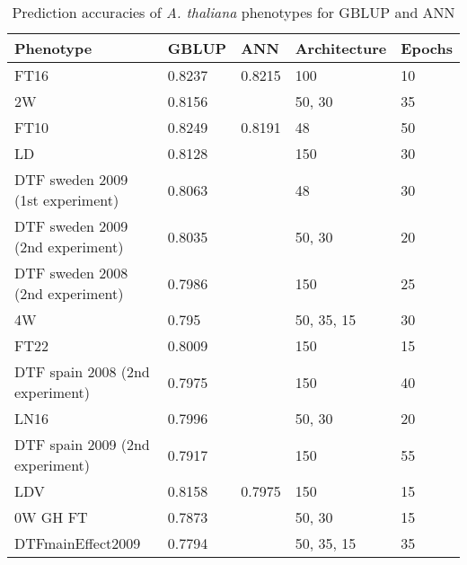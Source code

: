 \singlespacing
\begin{longtable}{p{} p{} p{} p{} p{}}

  \caption[Prediction accuracies of \textit{A. thaliana} phenotypes for GBLUP and ANN]{Prediction accuracies of \textit{A. thaliana} phenotypes for GBLUP and ANN}  \\
  \toprule
  Phenotype                          & GBLUP   & ANN                  & Architecture & Epochs \\
  \midrule
  FT16                               & 0.8237  & 0.8215               & 100          & 10     \\
  2W                                 & 0.8156  & \color{red}{0.8205}  & 50, 30       & 35     \\
  FT10                               & 0.8249  & 0.8191               & 48           & 50     \\
  LD                                 & 0.8128  & \color{red}{0.8159}  & 150          & 30     \\
  DTF sweden 2009 (1st experiment)   & 0.8063  & \color{red}{0.8141}  & 48           & 30     \\
  DTF sweden 2009 (2nd experiment)   & 0.8035  & \color{red}{0.8091}  & 50, 30       & 20     \\
  DTF sweden 2008 (2nd experiment)   & 0.7986  & \color{red}{0.8057}  & 150          & 25     \\
  4W                                 & 0.795   & \color{red}{0.8052}  & 50, 35, 15   & 30     \\
  FT22                               & 0.8009  & \color{red}{0.8043}  & 150          & 15     \\
  DTF spain 2008 (2nd experiment)    & 0.7975  & \color{red}{0.8032}  & 150          & 40     \\
  LN16                               & 0.7996  & \color{red}{0.7999}  & 50, 30       & 20     \\
  DTF spain 2009 (2nd experiment)    & 0.7917  & \color{red}{0.7988}  & 150          & 55     \\
  LDV                                & 0.8158  & 0.7975               & 150          & 15     \\
  0W GH FT                           & 0.7873  & \color{red}{0.7942}  & 50, 30       & 15     \\
  DTFmainEffect2009                  & 0.7794  & \color{red}{0.7855}  & 50, 35, 15   & 35     \\

\end{longtable}
